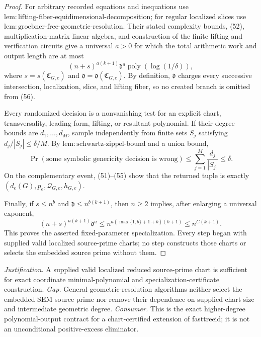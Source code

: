 \documentclass{article}
\begin{document}
\begin{proof}
For arbitrary recorded equations and inequations use \(\mathrm{lem:lifting\mbox{-}fiber\mbox{-}equidimensional\mbox{-}decomposition}\); for regular localized slices use \(\mathrm{lem:groebner\mbox{-}free\mbox{-}geometric\mbox{-}resolution}\).  Their stated complexity bounds, (52), multiplication-matrix linear algebra, and construction of the finite lifting and verification circuits give a universal \(a>0\) for which the total arithmetic work and output length are at most
\[
 (n+s)^{a(k+1)}\mathfrak d^a
 \operatorname{poly}(\log(1/\delta)),
\tag{56}
\]
where \(s=s(\mathfrak C_{G,e})\) and \(\mathfrak d=\mathfrak d(\mathfrak C_{G,e})\).  By definition, \(\mathfrak d\) charges every successive intersection, localization, slice, and lifting fiber, so no created branch is omitted from (56).

Every randomized decision is a nonvanishing test for an explicit chart, transversality, leading-form, lifting, or resultant polynomial.  If their degree bounds are \(d_1,\ldots,d_M\), sample independently from finite sets \(S_j\) satisfying \(d_j/|S_j|\leq\delta/M\).  By \(\mathrm{lem:schwartz\mbox{-}zippel\mbox{-}bound}\) and a union bound,
\[
 \Pr(\text{some symbolic genericity decision is wrong})
 \leq\sum_{j=1}^M\frac{d_j}{|S_j|}\leq\delta.
\tag{57}
\]
On the complementary event, (51)--(55) show that the returned tuple is exactly \((d_e(G),p_e,\mathcal Q_{G,e},h_{G,e})\).

Finally, if \(s\leq n^b\) and \(\mathfrak d\leq n^{b(k+1)}\), then \(n\geq2\) implies, after enlarging a universal exponent,
\[
 (n+s)^{a(k+1)}\mathfrak d^a
 \leq n^{a(\max\{1,b\}+1+b)(k+1)}
 \leq n^{C(k+1)}.
\tag{58}
\]
This proves the asserted fixed-parameter specialization.  Every step began with supplied valid localized source-prime charts; no step constructs those charts or selects the embedded source prime without them.
\end{proof}
\par\smallskip\noindent \textit{Justification.} A supplied valid localized reduced source-prime chart is sufficient for exact coordinate minimal-polynomial and specialization-certificate construction. \textit{Gap.} General geometric-resolution algorithms neither select the embedded SEM source prime nor remove their dependence on supplied chart size and intermediate geometric degree. \textit{Consumer.} This is the exact higher-degree polynomial-output contract for a chart-certified extension of fasttreeid; it is not an unconditional positive-excess eliminator.
\end{document}

